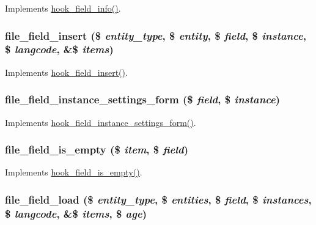 \label{file_8field_8inc_a58982edb906e7c17a5233247ccb712c0}
Implements \hyperlink{group__field__types_gad3eb779f26f41b520f19af011ece3eb1}{hook\_\-field\_\-info()}. \hypertarget{file_8field_8inc_a86f10a6835cfef9dadc90a936290757d}{
\subsubsection[{file\_\-field\_\-insert}]{\setlength{\rightskip}{0pt plus 5cm}file\_\-field\_\-insert (\$ {\em entity\_\-type}, \/  \$ {\em entity}, \/  \$ {\em field}, \/  \$ {\em instance}, \/  \$ {\em langcode}, \/  \&\$ {\em items})}}
\label{file_8field_8inc_a86f10a6835cfef9dadc90a936290757d}
Implements \hyperlink{group__field__types_ga2d29ec2e4a47170d5aaaf41bdd4813df}{hook\_\-field\_\-insert()}. \hypertarget{file_8field_8inc_af5fb6a3103be10a56bcad48b6bfadfc6}{
\subsubsection[{file\_\-field\_\-instance\_\-settings\_\-form}]{\setlength{\rightskip}{0pt plus 5cm}file\_\-field\_\-instance\_\-settings\_\-form (\$ {\em field}, \/  \$ {\em instance})}}
\label{file_8field_8inc_af5fb6a3103be10a56bcad48b6bfadfc6}
Implements \hyperlink{group__field__types_gacce0ff92e36c0054ad131d95e576a13a}{hook\_\-field\_\-instance\_\-settings\_\-form()}. \hypertarget{file_8field_8inc_a677d2a195d30d6c25769966bc322a899}{
\subsubsection[{file\_\-field\_\-is\_\-empty}]{\setlength{\rightskip}{0pt plus 5cm}file\_\-field\_\-is\_\-empty (\$ {\em item}, \/  \$ {\em field})}}
\label{file_8field_8inc_a677d2a195d30d6c25769966bc322a899}
Implements \hyperlink{group__field__types_ga192dd7e7a02a7bc9e0af8b67b187b071}{hook\_\-field\_\-is\_\-empty()}. \hypertarget{file_8field_8inc_a003cceddcd9032c60a076b0bfd283cb5}{
\subsubsection[{file\_\-field\_\-load}]{\setlength{\rightskip}{0pt plus 5cm}file\_\-field\_\-load (\$ {\em entity\_\-type}, \/  \$ {\em entities}, \/  \$ {\em field}, \/  \$ {\em instances}, \/  \$ {\em langcode}, \/  \&\$ {\em items}, \/  \$ {\em age})}}
